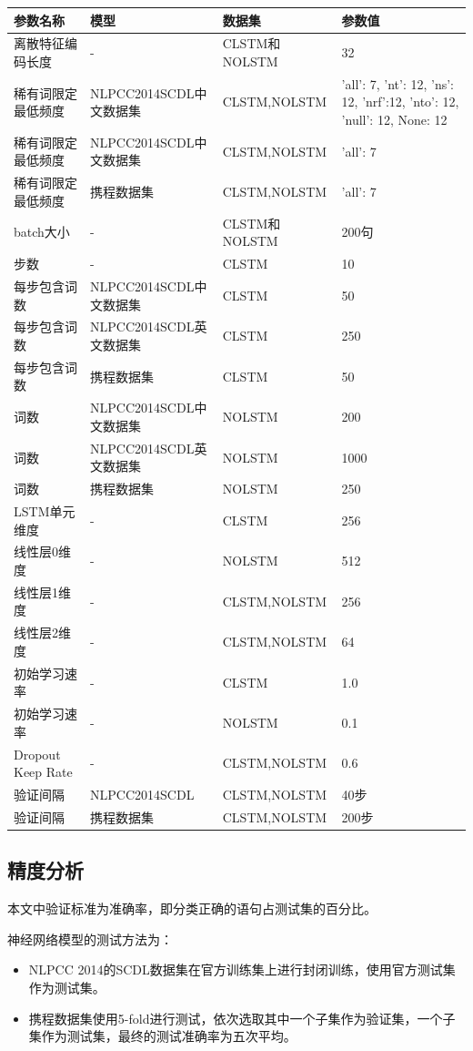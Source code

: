\begin{center}
\begin{longtabu} to \textwidth{X|X|X|X}
\hline
参数名称 & 模型 & 数据集 & 参数值
\\\hline
离散特征编码长度 & - & CLSTM和NOLSTM & 32
\\\hline
稀有词限定最低频度 & NLPCC2014SCDL中文数据集 & CLSTM,NOLSTM & 'all': 7, 'nt': 12, 'ns': 12, 'nrf':12, 'nto': 12, 'null': 12, None: 12
\\\hline
稀有词限定最低频度 & NLPCC2014SCDL中文数据集 & CLSTM,NOLSTM & 'all': 7
\\\hline
稀有词限定最低频度 & 携程数据集 & CLSTM,NOLSTM & 'all': 7
\\\hline
batch大小 & - & CLSTM和NOLSTM & 200句
\\\hline
步数 & - & CLSTM & 10
\\\hline
每步包含词数 & NLPCC2014SCDL中文数据集 & CLSTM & 50
\\\hline
每步包含词数 & NLPCC2014SCDL英文数据集 & CLSTM & 250
\\\hline
每步包含词数 & 携程数据集 & CLSTM & 50
\\\hline
词数 & NLPCC2014SCDL中文数据集 & NOLSTM & 200
\\\hline
词数 & NLPCC2014SCDL英文数据集 & NOLSTM & 1000
\\\hline
词数 & 携程数据集 & NOLSTM & 250
\\\hline
LSTM单元维度 & - & CLSTM & 256
\\\hline
线性层0维度 & - & NOLSTM & 512
\\\hline
线性层1维度 & - & CLSTM,NOLSTM & 256
\\\hline
线性层2维度 & - & CLSTM,NOLSTM & 64
\\\hline
初始学习速率 & - & CLSTM & 1.0
\\\hline
初始学习速率 & - & NOLSTM & 0.1
\\\hline
Dropout Keep Rate & - & CLSTM,NOLSTM & 0.6
\\\hline
验证间隔 & NLPCC2014SCDL & CLSTM,NOLSTM & 40步 
\\\hline
验证间隔 & 携程数据集 & CLSTM,NOLSTM & 200步
\\\hline
\end{longtabu}
\end{center}

\subsection{精度分析}
本文中验证标准为准确率，即分类正确的语句占测试集的百分比。\par
神经网络模型的测试方法为：\par
\begin{itemize}
\item NLPCC 2014的SCDL数据集在官方训练集上进行封闭训练，使用官方测试集作为测试集。
\item 携程数据集使用5-fold进行测试，依次选取其中一个子集作为验证集，一个子集作为测试集，最终的测试准确率为五次平均。
\end{itemize}



